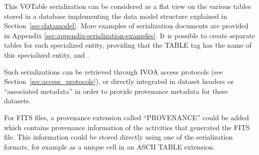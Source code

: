 This VOTable serialization can be considered as a flat view on the various tables stored in a database implementing the data model structure explained in Section~\ref{sec:datamodel}.
More examples of serialization documents are provided in Appendix \ref{sec:appendix-serialization-examples}.
It is possible to create separate tables for each specialized entity, providing that the TABLE tag has the name of this specialized entity, and .

Such serializations can be retrieved through IVOA access protocols (see Section~\ref{sec:access_protocols}), %
or directly integrated in dataset headers or ``associated metadata'' in order to provide provenance metadata for these datasets. 

For FITS files, a provenance extension called ``PROVENANCE'' could be added which contains provenance information of the activities that generated the FITS file. This information could be stored directly using one of the serialization formats, for example as a unique cell in an ASCII TABLE extension.


